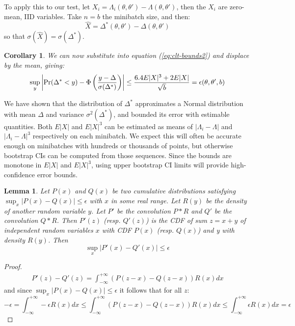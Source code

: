 \documentclass{article}
\newtheorem{lemma}{Lemma}
\newtheorem{corollary}{Corollary}
\begin{document}
To apply this to our test, let $X_i = \Lambda_i(\theta,\theta') - \Lambda(\theta,\theta')$,
then the $X_i$ are zero-mean, IID variables.
Take $n=b$ the minibatch size, and then:
\begin{equation}
\hat{X} = \Delta^*(\theta,\theta') - \Delta(\theta,\theta') 
\end{equation}
so that $\sigma(\hat{X}) = \sigma(\Delta^*)$.
\begin{corollary}
  We can now substitute into equation (\ref{eq:clt-bounds2}) and displace by the mean, giving:
\begin{equation}\label{eq:clt-bounds3}
   \sup_y\left|{\rm Pr}(\Delta^*< y) - \Phi\left(\frac{y-\Delta}{\sigma(\Delta^*)}\right)\right| \leq \frac{6.4E|X|^3+2E|X|}{\sqrt{b}} = \epsilon(\theta,\theta',b)
\end{equation}
\end{corollary}

We have shown that the distribution of $\Delta^*$ approximates a
Normal distribution with mean $\Delta$ and variance
$\sigma^2(\Delta^*)$, and bounded its error with estimable
quantities. Both $E|X|$ and $E|X|^3$ can be estimated as means of
$|\Lambda_i - \Lambda|$ and $|\Lambda_i - \Lambda|^3$ respectively on each minibatch. We expect this
will often be accurate enough on minibatches with hundreds or
thousands of points, but otherwise bootstrap CIs can be computed from
those sequences. Since the bounds are monotone in $E|X|$ and $E|X|^3$,
using upper bootstrap CI limits will provide high-confidence error bounds. 

\begin{lemma} Let $P(x)$ and $Q(x)$ be two cumulative distributions satisfying $\sup_x|P(x)-Q(x)|\leq \epsilon$ with
  $x$ in some real range. Let $R(y)$ be the {\em density} of another
  random variable $y$. Let $P'$ be the convolution $P*R$ and $Q'$ be
  the convolution $Q*R$. Then $P'(z)$ (resp. $Q'(z)$) is the CDF of sum
  $z=x+y$ of independent random variables $x$ with CDF $P(x)$ (resp. $Q(x)$) and y
  with density $R(y)$.  Then
  \begin{equation}
    \sup_x|P'(x)-Q'(x)|\leq \epsilon
  \end{equation}
  \end{lemma}
\begin{proof}
  \begin{equation}
    \begin{split}
      P'(z) - Q'(z) = \int_{-\infty}^{+\infty}(P(z-x)-Q(z-x))R(x) dx
    \end{split}
  \end{equation}
  and since $\sup_x|P(x)-Q(x)|\leq \epsilon$ it follows that for all $z$:
  \begin{equation}
- \epsilon = \int_{-\infty}^{+\infty} -\epsilon R(x) dx \leq \int_{-\infty}^{+\infty}(P(z-x)-Q(z-x))R(x) dx \leq \int_{-\infty}^{+\infty}\epsilon R(x) dx = \epsilon
  \end{equation}
\end{proof}
\end{document}
